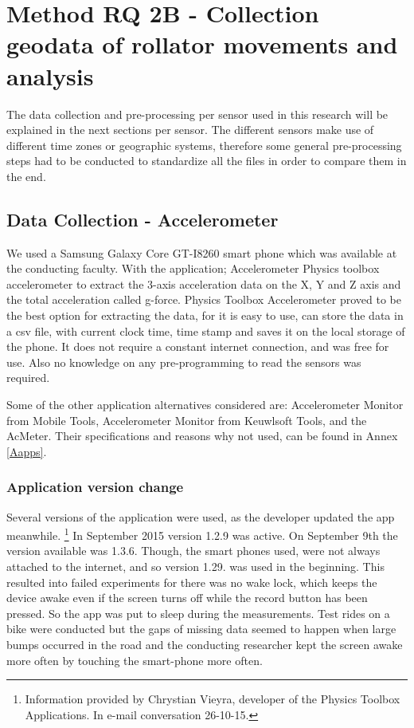 \section{Method RQ 2B - Collection geodata of rollator movements and analysis}
The data collection and pre-processing per sensor used in this research will be explained in the next sections per sensor. The different sensors make use of different time zones or geographic systems, therefore some general pre-processing steps had to be conducted to standardize all the files in order to compare them in the end. 

\subsection{Data Collection - Accelerometer}
We used a Samsung Galaxy Core GT-I8260 smart phone which was available at the conducting faculty. With the application; Accelerometer Physics toolbox accelerometer to extract the 3-axis acceleration data on the X, Y and Z axis and the total acceleration called g-force. Physics Toolbox Accelerometer proved to be the best option for extracting the data, for it is easy to use, can store the data in a csv file, with current clock time, time stamp and saves it on the local storage of the phone. It does not require a constant internet connection, and was free for use. Also no knowledge on any pre-programming to read the sensors was required.

Some of the other application alternatives considered are: Accelerometer Monitor from Mobile Tools, Accelerometer Monitor from Keuwlsoft Tools, and the AcMeter. Their specifications and reasons why not used, can be found in Annex \ref{Aapps}. 

\subsubsection{Application version change}
Several versions of the application were used, as the developer updated the app meanwhile. \footnote{Information provided by Chrystian Vieyra, developer of the Physics Toolbox Applications. In e-mail conversation 26-10-15. }
In September 2015 version 1.2.9 was active. On September 9th the version available was 1.3.6. Though, the smart phones used, were not always attached to the internet, and so version 1.29. was used in the beginning. This resulted into failed experiments for there was no wake lock, which keeps the device awake even if the screen turns off while the record button has been pressed. So the app was put to sleep during the measurements. Test rides on a bike were conducted but the gaps of missing data seemed to happen when large bumps occurred in the road and the conducting researcher kept the screen awake more often by touching the smart-phone more often. 

